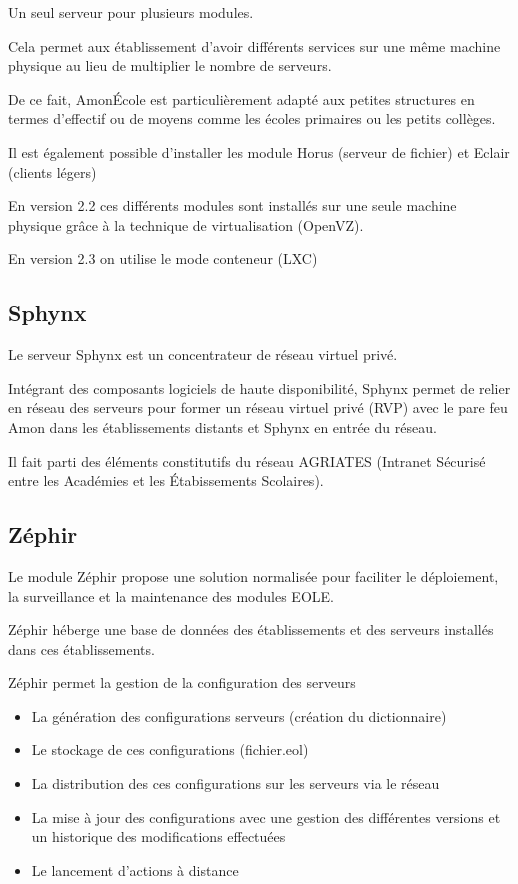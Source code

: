 Un seul serveur pour plusieurs modules.

Cela permet aux établissement d'avoir différents services sur une même machine
physique au lieu de multiplier le nombre de serveurs.

De ce fait, AmonÉcole est particulièrement adapté aux petites structures en
termes d'effectif ou de moyens comme les écoles primaires ou les petits
collèges.

Il est également possible d'installer les module Horus (serveur de fichier)
et Eclair (clients légers)

En version 2.2 ces différents modules sont installés sur une seule machine
physique grâce à la technique de virtualisation (OpenVZ).

En version 2.3 on utilise le mode conteneur (LXC)

\subsection{Sphynx}

Le serveur Sphynx est un concentrateur de réseau virtuel privé.

Intégrant des composants logiciels de haute disponibilité, Sphynx permet
de relier en réseau des serveurs pour former un réseau virtuel privé (RVP) 
avec le pare feu Amon dans les établissements distants et Sphynx en entrée du
réseau.

Il fait parti des éléments constitutifs du réseau AGRIATES (Intranet Sécurisé
entre les Académies et les Étabissements Scolaires).

\subsection{Zéphir}

Le module Zéphir propose une solution normalisée pour faciliter le
déploiement, la surveillance et la maintenance des modules EOLE.

Zéphir héberge une base de données des établissements et des serveurs 
installés dans ces établissements.

Zéphir permet la gestion de la configuration des serveurs

\begin{itemize}
  \item La génération des configurations serveurs (création du dictionnaire)
  \item Le stockage de ces configurations (fichier.eol)
  \item La distribution des ces configurations sur les serveurs via le réseau
  \item La mise à jour des configurations avec une gestion des différentes 
        versions et un historique des modifications effectuées
  \item Le lancement d'actions à distance
\end{itemize}

